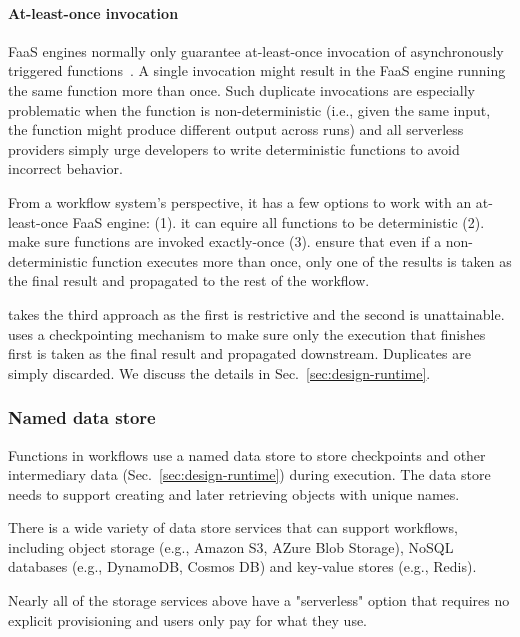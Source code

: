 \paragraph{At-least-once invocation}

FaaS engines normally only guarantee at-least-once invocation of
asynchronously triggered
functions~\cite{google-cloud-functions-exec-guarantee,
aws-lambda-async-invoke, azure-functions-exec-guarantee}. A single invocation
might result in the FaaS engine running the same function more than once. Such
duplicate invocations are especially problematic when the function is
non-deterministic (i.e., given the same input, the function might produce
different output across runs) and all serverless providers simply urge
developers to write deterministic functions to avoid incorrect behavior.

From a workflow system's perspective, it has a few options to work with an
at-least-once FaaS engine: (1). it can equire all functions to be
deterministic (2). make sure functions are invoked exactly-once (3). ensure
that even if a non-deterministic function executes more than once, only one of
the results is taken as the final result and propagated to the rest of the
workflow.

\name{} takes the third approach as the first is restrictive and the second is
unattainable. \name{} uses a checkpointing mechanism to make sure only the
execution that finishes first is taken as the final result and propagated
downstream. Duplicates are simply discarded. We discuss the details in
Sec.~\ref{sec:design-runtime}.

\subsubsection{Named data store}

Functions in \name{} workflows use a named data store to store checkpoints and
other intermediary data (Sec.~\ref{sec:design-runtime}) during execution. The
data store needs to support creating and later retrieving objects with unique
names.

There is a wide variety of data store services that can support \name{}
workflows, including object storage (e.g., Amazon S3, AZure Blob Storage),
NoSQL databases (e.g., DynamoDB, Cosmos DB) and key-value stores (e.g.,
Redis).

Nearly all of the storage services above have a "serverless" option that
requires no explicit provisioning and users only pay for what they use.

